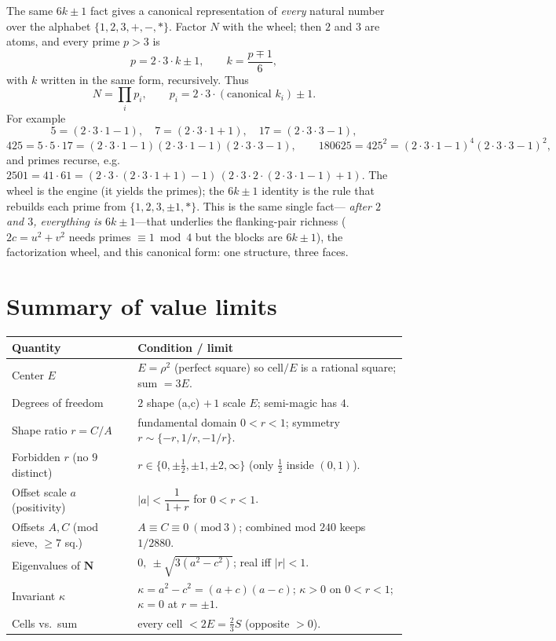 \documentclass[11pt]{article}
\newcommand{\N}{\mathbf{N}}
\begin{document}
The same $6k\pm1$ fact gives a canonical representation of \emph{every} natural
number over the alphabet $\{1,2,3,+,-,*\}$. Factor $N$ with the wheel; then $2$ and
$3$ are atoms, and every prime $p>3$ is
\[
p = 2\cdot3\cdot k \pm 1,\qquad k=\frac{p\mp1}{6},
\]
with $k$ written in the same form, recursively. Thus
\[
N=\prod_i p_i,\qquad p_i=2\cdot3\cdot(\text{canonical }k_i)\pm1 .
\]
For example
\[
5=(2{\cdot}3{\cdot}1-1),\quad 7=(2{\cdot}3{\cdot}1+1),\quad 17=(2{\cdot}3{\cdot}3-1),
\]
\[
425=5\cdot5\cdot17=(2{\cdot}3{\cdot}1-1)(2{\cdot}3{\cdot}1-1)(2{\cdot}3{\cdot}3-1),
\qquad
180625=425^2=(2{\cdot}3{\cdot}1-1)^4(2{\cdot}3{\cdot}3-1)^2,
\]
and primes recurse, e.g.\ $2501=41\cdot61=(2{\cdot}3{\cdot}(2{\cdot}3{\cdot}1+1)-1)\,
(2{\cdot}3{\cdot}2{\cdot}(2{\cdot}3{\cdot}1-1)+1)$.
The wheel is the engine (it yields the primes); the $6k\pm1$ identity is the rule
that rebuilds each prime from $\{1,2,3,\pm1,*\}$. This is the same single fact---%
\emph{after $2$ and $3$, everything is $6k\pm1$}---that underlies the flanking-pair
richness ($2c=u^2+v^2$ needs primes $\equiv1\bmod4$ but the blocks are $6k\pm1$),
the factorization wheel, and this canonical form: one structure, three faces.

\section{Summary of value limits}

\begin{center}
\renewcommand{\arraystretch}{1.35}
\begin{tabular}{p{4.7cm} p{9.5cm}}
\hline
\textbf{Quantity} & \textbf{Condition / limit}\\
\hline
Center $E$ & $E=\rho^2$ (perfect square) so cell$/E$ is a rational square; sum $=3E$.\\
Degrees of freedom & $2$ shape (a,c) $+\,1$ scale $E$; semi-magic has $4$.\\
Shape ratio $r=C/A$ & fundamental domain $0<r<1$; symmetry $r\sim\{-r,1/r,-1/r\}$.\\
Forbidden $r$ (no $9$ distinct) & $r\in\{0,\pm\tfrac12,\pm1,\pm2,\infty\}$ (only $\tfrac12$ inside $(0,1)$).\\
Offset scale $a$ (positivity) & $|a|<\dfrac{1}{1+r}$ for $0<r<1$.\\
Offsets $A,C$ (mod sieve, $\ge7$ sq.) & $A\equiv C\equiv0\ (\mathrm{mod}\ 3)$; combined mod $240$ keeps $1/2880$.\\
Eigenvalues of $\N$ & $0,\ \pm\sqrt{3(a^2-c^2)}$; real iff $|r|<1$.\\
Invariant $\kappa$ & $\kappa=a^2-c^2=(a+c)(a-c)$; $\kappa>0$ on $0<r<1$; $\kappa=0$ at $r=\pm1$.\\
Cells vs.\ sum & every cell $<2E=\tfrac23 S$ (opposite $>0$).\\
\hline
\end{tabular}
\end{center}
\end{document}
